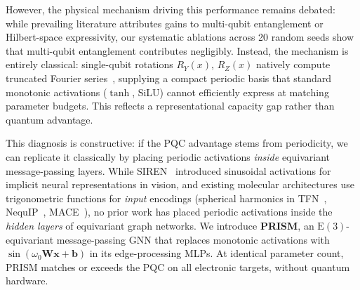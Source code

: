 \documentclass[10pt,twocolumn,letterpaper]{article}
\begin{document}
However, the physical mechanism driving this performance remains debated: while prevailing literature attributes gains to multi-qubit entanglement or Hilbert-space expressivity, our systematic ablations across 20 random seeds show that multi-qubit entanglement contributes negligibly. Instead, the mechanism is entirely classical: single-qubit rotations $R_Y(x)$, $R_Z(x)$ natively compute truncated Fourier series~\cite{Schuld:2020enb, Perez-Salinas:2019pjx}, supplying a compact periodic basis that standard monotonic activations ($\tanh$, SiLU) cannot efficiently express at matching parameter budgets. This reflects a representational capacity gap rather than quantum advantage.

This diagnosis is constructive: if the PQC advantage stems from periodicity, we can replicate it classically by placing periodic activations \textit{inside} equivariant message-passing layers. While SIREN~\cite{sitzmann2020siren} introduced sinusoidal activations for implicit neural representations in vision, and existing molecular architectures use trigonometric functions for \textit{input} encodings (spherical harmonics in TFN~\cite{thomasTensorFieldNetworks2018}, NequIP~\cite{batznerE3equivariantGraphNeural2021}, MACE~\cite{batatiaMACEHigherOrder2022}), no prior work has placed periodic activations inside the \textit{hidden layers} of equivariant graph networks. We introduce \textbf{PRISM}, an $\mathrm{E}(3)$-equivariant message-passing GNN that replaces monotonic activations with $\sin(\omega_0 \mathbf{W} \mathbf{x} + \mathbf{b})$ in its edge-processing MLPs. At identical parameter count, PRISM matches or exceeds the PQC on all electronic targets, without quantum hardware.
\end{document}
